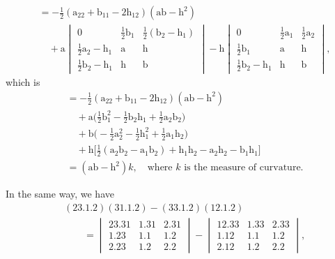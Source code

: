 \documentclass[11pt,a4paper]{article}
\begin{document}
\begin{align*}
&= -\tfrac{1}{2}(\text{a}_{22} + \text{b}_{11} - 2\text{h}_{12})(\text{a}\text{b} - \text{h}^{2})\\
&\quad + \text{a}\begin{vmatrix} 0 & \tfrac{1}{2}\text{b}_{1} & \tfrac{1}{2}(\text{b}_{2}-\text{h}_{1})\\
                                  \tfrac{1}{2}\text{a}_{2}-\text{h}_{1} & \text{a} & \text{h}\\
                                  \tfrac{1}{2}\text{b}_{2}-\text{h}_{1} & \text{h} & \text{b} \end{vmatrix}
       - \text{h}\begin{vmatrix} 0 & \tfrac{1}{2}\text{a}_{1} & \tfrac{1}{2}\text{a}_{2}\\
                                  \tfrac{1}{2}\text{b}_{1} & \text{a} & \text{h}\\
                                  \tfrac{1}{2}\text{b}_{2}-\text{h}_{1} & \text{h} & \text{b} \end{vmatrix},
\end{align*}
which is
\begin{align*}
&= -\tfrac{1}{2}(\text{a}_{22} + \text{b}_{11} - 2\text{h}_{12})(\text{a}\text{b} - \text{h}^{2})\\
&\quad + \text{a}\big(\tfrac{1}{2}\text{b}_{1}^{2} - \tfrac{1}{2}\text{b}_{2}\text{h}_{1} + \tfrac{1}{2}\text{a}_{2}\text{b}_{2}\big)\\
&\quad + \text{b}\big(-\tfrac{1}{2}\text{a}_{2}^{2} - \tfrac{1}{2}\text{h}_{1}^{2} + \tfrac{1}{2}\text{a}_{1}\text{h}_{2}\big)\\
&\quad + \text{h}\big[\tfrac{1}{2}(\text{a}_{2}\text{b}_{2} - \text{a}_{1}\text{b}_{2}) + \text{h}_{1}\text{h}_{2} - \text{a}_{2}\text{h}_{2} - \text{b}_{1}\text{h}_{1}\big]\\
&= (\text{a}\text{b} - \text{h}^{2})k,\quad\text{where $k$ is the measure of curvature.}
\end{align*}

In the same way, we have
\begin{align*}
&(23.1.2)(31.1.2) - (33.1.2)(12.1.2)\\
&\qquad= \begin{vmatrix} 23.31 & 1.31 & 2.31\\ 1.23 & 1.1 & 1.2\\ 2.23 & 1.2 & 2.2 \end{vmatrix}
       - \begin{vmatrix} 12.33 & 1.33 & 2.33\\ 1.12 & 1.1 & 1.2\\ 2.12 & 1.2 & 2.2 \end{vmatrix},
\end{align*}
\clearpage
\end{document}
